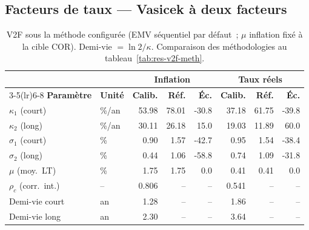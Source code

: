 \documentclass[11pt,a4paper]{article}
\theoremstyle{definition}
\begin{document}
\subsection{Facteurs de taux --- Vasicek à deux facteurs}
\begin{table}[H]\centering\small\renewcommand{\arraystretch}{1.25}\setlength{\tabcolsep}{5pt}
\begin{tabularx}{\textwidth}{@{}l X r r r r r r@{}}
\toprule
& & \multicolumn{3}{c}{\textbf{Inflation}} & \multicolumn{3}{c}{\textbf{Taux réels}}\\
\cmidrule(lr){3-5}\cmidrule(lr){6-8}
\textbf{Paramètre} & \textbf{Unité} & \textbf{Calib.} & \textbf{Réf.} & \textbf{Éc.} & \textbf{Calib.} & \textbf{Réf.} & \textbf{Éc.}\\
\midrule
$\kappa_1$ (court) & \%/an & 53.98 & 78.01 & -30.8 & 37.18 & 61.75 & -39.8\\
$\kappa_2$ (long) & \%/an & 30.11 & 26.18 & 15.0 & 19.03 & 11.89 & 60.0\\
$\sigma_1$ (court) & \% & 0.90 & 1.57 & -42.7 & 0.95 & 1.54 & -38.4\\
$\sigma_2$ (long) & \% & 0.44 & 1.06 & -58.8 & 0.74 & 1.09 & -31.8\\
$\mu$ (moy.\ LT) & \% & 1.75 & 1.75 & 0.0 & 0.41 & 0.41 & 0.0\\
$\rho_c$ (corr.\ int.) & -- & 0.806 & -- & -- & 0.541 & -- & --\\
\addlinespace
Demi-vie court & an & 1.28 & -- & -- & 1.86 & -- & --\\
Demi-vie long & an & 2.30 & -- & -- & 3.64 & -- & --\\
\bottomrule\end{tabularx}
\caption{V2F sous la méthode configurée (EMV séquentiel par défaut~; $\mu$ inflation fixé à la cible COR). Demi-vie $=\ln 2/\kappa$. Comparaison des méthodologies au tableau~\ref{tab:res-v2f-meth}.}\label{tab:res-v2f}
\end{table}
\end{document}
